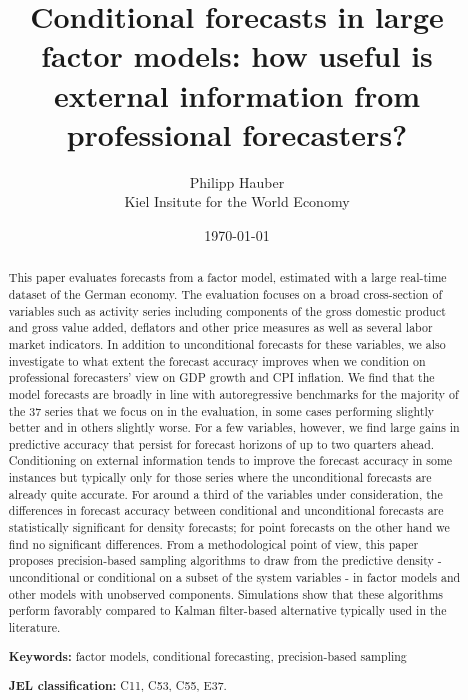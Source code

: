 \documentclass[notitlepage,a4paper,12pt]{article}
\begin{document}
\title{Conditional forecasts in large factor models: how useful is external information from professional forecasters?}

\author{
  Philipp Hauber\\
  Kiel Insitute for the World Economy
}
\date{\today}

\maketitle

\begin{abstract}\noindent
    This paper evaluates forecasts from a factor model, estimated with a large real-time dataset of the German economy. The evaluation focuses on a broad cross-section of variables such as activity series including components of the gross domestic product and gross value added, deflators and other price measures as well as several labor market indicators. In addition to unconditional forecasts for these variables, we also investigate to what extent the forecast accuracy improves when we condition on professional forecasters' view on GDP growth and CPI inflation. We find that the model forecasts are broadly in line with autoregressive benchmarks for the majority of the 37 series that we focus on in the evaluation, in some cases performing slightly better and in others slightly worse. For a few variables, however, we find large gains in predictive accuracy that persist for forecast horizons of up to two quarters ahead. Conditioning on external information tends to improve the forecast accuracy in some instances but typically only for those series where the unconditional forecasts are already quite accurate. For around a third of the variables under consideration, the differences in forecast accuracy between conditional and unconditional forecasts are statistically significant for density forecasts; for point forecasts on the other hand we find no significant differences. From a methodological point of view, this paper proposes precision-based sampling algorithms to draw from the predictive density - unconditional or conditional on a subset of the system variables - in factor models and other models with unobserved components. Simulations show that these algorithms perform favorably compared to Kalman filter-based alternative typically used in the literature.  
    
    \bigskip\noindent\textbf{Keywords:} factor models, conditional forecasting, precision-based sampling
    
    \bigskip\noindent \textbf{JEL classification:} C11, C53, C55, E37.
    \vfill
    \end{abstract}
    
\end{document}
